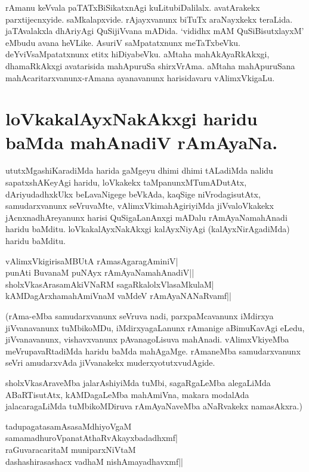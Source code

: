 rAmanu keVvala paTATxBiSikatxnAgi kuLitubiDalilalx. avatArakekx parxtijecnxyide. saMkalapxvide. rAjayxvanunx biTuTx araNayxkekx teraLida. jaTAvalakxla dhAriyAgi QuSijiVvana mADida. `vididhx mAM QuSiBisutxlayxM'\label{151b} eMbudu avana heVLike. AsuriV saMpatatxnunx meTaTxbeVku. deYviVsaMpatatxnunx etitx hiDiyabeVku. aMtaha mahAkAyaRkAkxgi, dhamaRkAkxgi avatarisida mahApuruSa shirxVrAma. aMtaha mahApuruSana mahAcaritarxvanunx-rAmana ayanavanunx harisidavaru vAlimxVkigaLu. 

\section*{loVkakalAyxNakAkxgi haridu baMda mahAnadiV rAmAyaNa.} 

ututxMgashiKaradiMda harida gaMgeyu dhimi dhimi tALadiMda nalidu sapatxshAKeyAgi haridu, loVkakekx taMpanunxMTumADutAtx, dAriyudadhxkUkx beLavaNigege beVkAda, kaqSige niVrodagisutAtx, samudarxvanunx seVruvaMte, vAlimxVkimahAgiriyiMda jiVvaloVkakekx jAcnxnadhAreyanunx harisi QuSigaLanAnxgi mADalu rAmAyaNamahAnadi haridu baMditu. loVkakalAyxNakAkxgi kalAyxNiyAgi (kalAyxNirAgadiMda) haridu baMditu. 

\begin{shloka} 
vAlimxVkigirisaMBUtA rAmasAgaragAminiV|\label{151a}\\ 
punAti BuvanaM puNAyx rAmAyaNamahAnadiV||\\ 
sholxVkasArasamAkiVNaRM sagaRkalolxVlasaMkulaM|\label{152b}\\ 
kAMDagArxhamahAmiVnaM vaMdeV rAmAyaNANaRvamf||
\end{shloka} 

(rAma-eMba samudarxvanunx seVruva nadi, parxpaMcavanunx iMdirxya jiVvanavanunx tuMbikoMDu, iMdirxyagaLanunx rAmanige aBimuKavAgi eLedu, jiVvanavanunx, vishavxvanunx pAvanagoLisuva mahAnadi. vAlimxVkiyeMba meVrupavaRtadiMda haridu baMda mahAgaMge. rAmaneMba samudarxvanunx seVri amudarxvAda jiVvanakekx muderxyotutxvudAgide. 

sholxVkasAraveMba jalarAshiyiMda tuMbi, sagaRgaLeMba alegaLiMda ABaRTisutAtx, kAMDagaLeMba mahAmiVna, makara modalAda jalacaragaLiMda tuMbikoMDiruva rAmAyaNaveMba aNaRvakekx namasAkxra.) 

\begin{shloka} 
tadupagatasamAsasaMdhiyoVgaM\label{152a}\\ 
samamadhuroVpanatAthaRvAkayxbadadhxmf|\\ 
raGuvaracaritaM muniparxNiVtaM\\ 
dashashirasashacx vadhaM nishAmayadhavxmf||
\end{shloka} 

